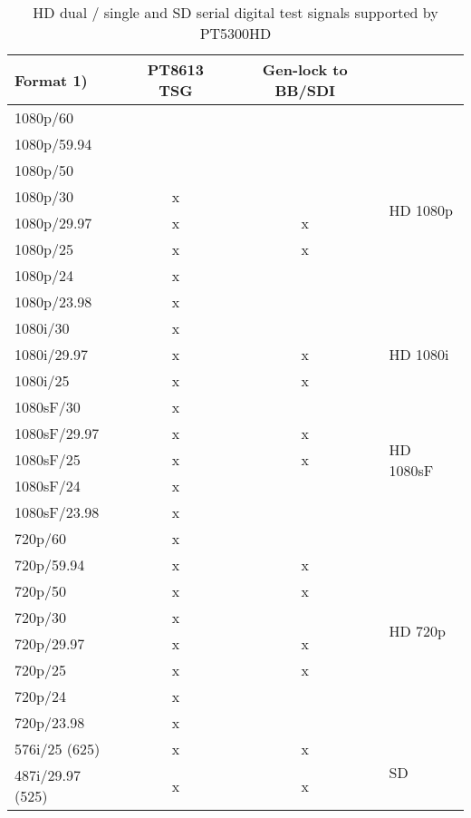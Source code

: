 \begin{table}[hbt]
\centering
\begin{tabular}{|l|c|c|p{0.5em}|}
\cline{1-3}
Format 1)			& PT8613 TSG	& Gen-lock to BB/SDI \\
\cline{1-3}
\hline
1080p/60			&  	& 	& \multirow{8}{*}{\begin{sideways}{\tiny HD 1080p}\end{sideways}} \\
\cline{1-3}
1080p/59.94		&  	&		& \\
\cline{1-3}
1080p/50			&	 	&		& \\
\cline{1-3}
1080p/30			&	x	&		& \\
\cline{1-3}
1080p/29.97		&	x	&	x	& \\
\cline{1-3}
1080p/25			&	x	&	x	& \\
\cline{1-3}
1080p/24			&	x	&		& \\
\cline{1-3}
1080p/23.98		&	x	&		& \\
\hline
\hline
1080i/30			& x	& 	& \multirow{3}{2cm}{\begin{sideways}{\tiny HD 1080i}\end{sideways}} \\
\cline{1-3}
1080i/29.97 	& x & x & \\
\cline{1-3}
1080i/25 			& x & x & \\
\hline
\hline
1080sF/30			& x	& 	& \multirow{5}{2cm}{\begin{sideways}{\tiny HD 1080sF}\end{sideways}} \\
\cline{1-3}
1080sF/29.97	&	x	&	x	& \\
\cline{1-3}
1080sF/25			&	x	&	x	& \\
\cline{1-3}
1080sF/24			&	x	&		& \\
\cline{1-3}
1080sF/23.98	&	x	&		& \\
\hline
\hline
720p/60				& x	& 	& \multirow{8}{*}{\begin{sideways}{\tiny HD 720p}\end{sideways}} \\
\cline{1-3}
720p/59.94		& x	&	x	& \\
\cline{1-3}
720p/50				&	x	&	x	& \\
\cline{1-3}
720p/30				&	x	&		& \\
\cline{1-3}
720p/29.97		&	x	&	x	& \\
\cline{1-3}
720p/25				&	x	&	x	& \\
\cline{1-3}
720p/24				&	x	&		& \\
\cline{1-3}
720p/23.98		&	x	&		& \\
\hline
\hline
576i/25 (625)			& x	& x	& \multirow{2}{*}{\begin{sideways}{\tiny SD}\end{sideways}} \\
\cline{1-3}
487i/29.97 (525)	&	x	&	x	& \\
\hline
\end{tabular}
\caption{HD dual / single and SD serial digital test signals supported by PT5300HD}
\label{tab:8613formats}
\end{table}

